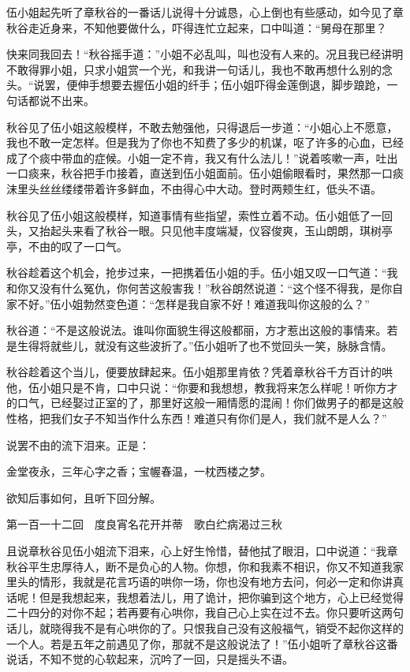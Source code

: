 \documentclass[12pt,UTF8]{ctexbook}
\begin{document}
{{{伍小姐起先听了章秋谷的一番话儿说得十分诚恳，心上倒也有些感动，如今见了章秋谷走近身来，不知他要做什么，吓得连忙立起来，口中叫道：“舅母在那里？

快来同我回去！“秋谷摇手道：”小姐不必乱叫，叫也没有人来的。况且我已经讲明不敢得罪小姐，只求小姐赏一个光，和我讲一句话儿，我也不敢再想什么别的念头。“说罢，便伸手想要去握伍小姐的纤手；伍小姐吓得金莲倒退，脚步踉跄，一句话都说不出来。

秋谷见了伍小姐这般模样，不敢去勉强他，只得退后一步道：“小姐心上不愿意，我也不敢一定怎样。但是我为了你也不知费了多少的机谋，呕了许多的心血，已经成了个痰中带血的症候。小姐一定不肯，我又有什么法儿！”说着咳嗽一声，吐出一口痰来，秋谷把手巾接着，直送到伍小姐面前。伍小姐偷眼看时，果然那一口痰沫里头丝丝缕缕带着许多鲜血，不由得心中大动。登时两颊生红，低头不语。

秋谷见了伍小姐这般模样，知道事情有些指望，索性立着不动。伍小姐低了一回头，又抬起头来看了秋谷一眼。只见他丰度端凝，仪容俊爽，玉山朗朗，琪树亭亭，不由的叹了一口气。

秋谷趁着这个机会，抢步过来，一把携着伍小姐的手。伍小姐又叹一口气道：“我和你又没有什么冤仇，你何苦这般害我！”秋谷朗然说道：“这个怪不得我，是你自家不好。”伍小姐勃然变色道：“怎样是我自家不好！难道我叫你这般的么？”

秋谷道：“不是这般说法。谁叫你面貌生得这般都丽，方才惹出这般的事情来。若是生得将就些儿，就没有这些波折了。”伍小姐听了也不觉回头一笑，脉脉含情。

秋谷趁着这个当儿，便要放肆起来。伍小姐那里肯依？凭着章秋谷千方百计的哄他，伍小姐只是不肯，口中只说：“你要和我想想，教我将来怎么样呢！听你方才的口气，已经娶过正室的了，那里好这般一厢情愿的混闹！你们做男子的都是这般性格，把我们女子不知当作什么东西！难道只有你们是人，我们就不是人么？”

说罢不由的流下泪来。正是：

金堂夜永，三年心字之香；宝幄春温，一枕西楼之梦。

欲知后事如何，且听下回分解。





第一百一十二回　度良宵名花开并蒂　歌白纻病渴过三秋





且说章秋谷见伍小姐流下泪来，心上好生怜惜，替他拭了眼泪，口中说道：“我章秋谷平生忠厚待人，断不是负心的人物。你想，你和我素不相识，你又不知道我家里头的情形，我就是花言巧语的哄你一场，你也没有地方去问，何必一定和你讲真话呢！但是我想起来，我想着法儿，用了诡计，把你骗到这个地方，心上已经觉得二十四分的对你不起；若再要有心哄你，我自己心上实在过不去。你只要听这两句话儿，就晓得我不是有心哄你的了。只恨我自己没有这般福气，销受不起你这样的一个人。若是五年之前遇见了你，那就不是这般说法了！”伍小姐听了章秋谷这番说话，不知不觉的心软起来，沉吟了一回，只是摇头不语。

}}}
\end{document}
